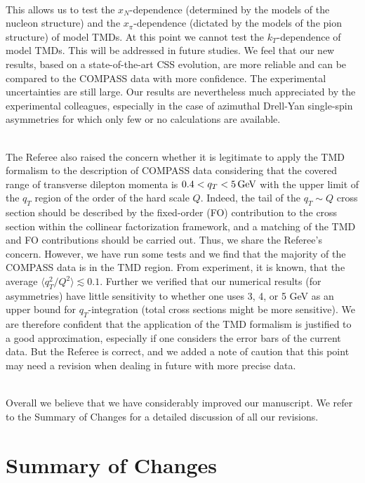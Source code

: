 \documentclass[a4paper]{article}
\begin{document}
\ \\
This allows us to test the $x_N$-dependence 
(determined by the models of the nucleon structure)
and the $x_\pi$-dependence (dictated by the models of the pion structure) 
of model TMDs. At this point we cannot test 
the  $k_T$-dependence of model TMDs. This will be addressed in future
studies. We feel that our new results, based on a state-of-the-art CSS
evolution, are more reliable and can be compared to the COMPASS data
with more confidence. The experimental uncertainties 
are still large. Our results are nevertheless much appreciated by the 
experimental colleagues, especially in the case of azimuthal Drell-Yan
single-spin asymmetries for which only few or no calculations are available.

\ \\
The Referee also raised the concern whether it is legitimate to apply 
the TMD formalism to the description of COMPASS data considering
that the covered range of transverse dilepton momenta is 
$0.4 < q_T < 5\,{\rm GeV}$ with the upper limit of the $q_T$ region 
of the order of the hard scale $Q$. Indeed, the tail of the $q_T\sim Q$ cross section
should be described by the fixed-order (FO) contribution to the cross section within the collinear factorization framework, and a matching of the TMD and FO contributions should be carried out. Thus, we share the Referee's concern. 
However, we have run  some tests and we find that the majority of the COMPASS data
is in the TMD region. From experiment,  it is known, 
 that the average $\langle q_T^2/Q^2\rangle \lesssim 0.1$. Further  we verified that our numerical results
(for asymmetries) have little sensitivity to whether one uses 
3, 4, or 5 GeV as an upper bound for $q_T$-integration 
(total cross sections might be more sensitive).
We are therefore confident that the application of the TMD formalism
is justified to a good approximation, especially if one considers
the error bars of the current data. But the Referee  is correct,  and we added a note of caution that this point may need
a revision when dealing in future with more precise data.

\ \\
Overall we believe that we have considerably improved our manuscript.
We refer to the Summary of Changes for a detailed discussion of 
all our revisions.

\section*{Summary of Changes}
\end{document}
